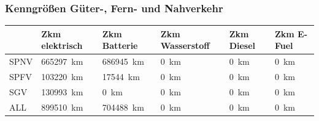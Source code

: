 \subsubsection{Kenngrößen Güter-, Fern- und Nahverkehr}
\begin{center}
\begin{tabularx}{\textwidth}{l|X|X|X|X|X} & Zkm elektrisch & Zkm Batterie & Zkm Wasserstoff & Zkm Diesel & Zkm E-Fuel \\
	\hline
	\uppercase{spnv} &
	\SI{665297}{\km} &
	\SI{686945}{\km} &
	\SI{0}{\km} &
	\SI{0}{\km} &
	\SI{0}{\km} \\
	\uppercase{spfv} &
	\SI{103220}{\km} &
	\SI{17544}{\km} &
	\SI{0}{\km} &
	\SI{0}{\km} &
	\SI{0}{\km} \\
	\uppercase{sgv} &
	\SI{130993}{\km} &
	\SI{0}{\km} &
	\SI{0}{\km} &
	\SI{0}{\km} &
	\SI{0}{\km} \\
	\uppercase{all} &
	\SI{899510}{\km} &
	\SI{704488}{\km} &
	\SI{0}{\km} &
	\SI{0}{\km} &
	\SI{0}{\km} \\
\end{tabularx}
\end{center}


